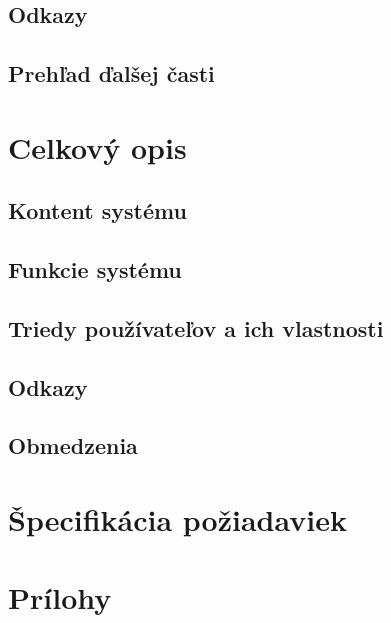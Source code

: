 \documentclass[12pt,a4paper]{report}
\begin{document}
\section[Odkazy]{\rmfamily\bfseries
	Odkazy}

\section[Prehľad ďalšej časti]{\rmfamily\bfseries
	Prehľad ďalšej časti}


\renewcommand{\chaptername}{}	
\chapter[Celkový opis]{\rmfamily\bfseries
	Celkový opis}

\section[Kontent systému]{\rmfamily\bfseries
	Kontent systému}

\section[Funkcie systému]{\rmfamily\bfseries
	Funkcie systému}

\section[Triedy používateľov a ich vlastnosti]{\rmfamily\bfseries
	Triedy používateľov a ich vlastnosti}

\section[Odkazy]{\rmfamily\bfseries
	Odkazy}

\section[Obmedzenia]{\rmfamily\bfseries
	Obmedzenia}

\renewcommand{\chaptername}{}	
\chapter[Špecifikácia požiadaviek]{\rmfamily\bfseries
	Špecifikácia požiadaviek}

\renewcommand{\chaptername}{}	
\chapter[Prílohy]{\rmfamily\bfseries
	Prílohy}
\end{document}
